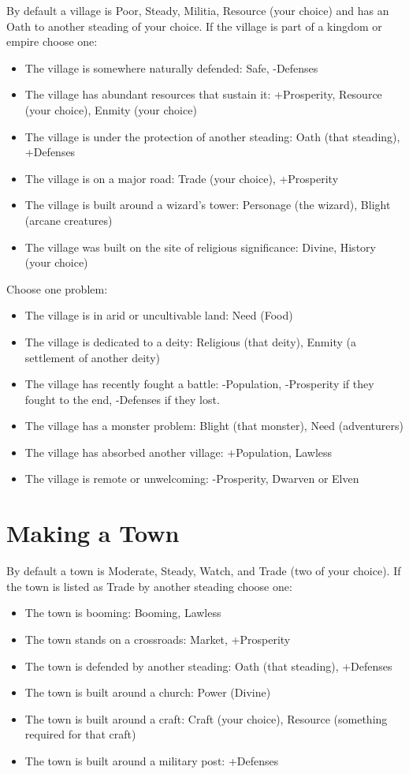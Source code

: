 By default a village is Poor, Steady, Militia, Resource (your choice) and has an Oath to another steading of your choice. If the village is part of a kingdom or empire choose one:
\begin{itemize}
\item The village is somewhere naturally defended: Safe, -Defenses
\item The village has abundant resources that sustain it: +Prosperity, Resource (your choice), Enmity (your choice)
\item The village is under the protection of another steading: Oath (that steading), +Defenses
\item The village is on a major road: Trade (your choice), +Prosperity
\item The village is built around a wizard's tower: Personage (the wizard), Blight (arcane creatures)
\item The village was built on the site of religious significance: Divine, History (your choice)

\end{itemize}


Choose one problem:
\begin{itemize}
\item The village is in arid or uncultivable land: Need (Food)
\item The village is dedicated to a deity: Religious (that deity), Enmity (a settlement of another deity)
\item The village has recently fought a battle: -Population, -Prosperity if they fought to the end, -Defenses if they lost.
\item The village has a monster problem: Blight (that monster), Need (adventurers)
\item The village has absorbed another village: +Population, Lawless
\item The village is remote or unwelcoming: -Prosperity, Dwarven or Elven

\end{itemize}
\section*{Making a Town}


By default a town is Moderate, Steady, Watch, and Trade (two of your choice). If the town is listed as Trade by another steading choose one:
\begin{itemize}
\item The town is booming: Booming, Lawless
\item The town stands on a crossroads: Market, +Prosperity
\item The town is defended by another steading: Oath (that steading), +Defenses
\item The town is built around a church: Power (Divine)
\item The town is built around a craft: Craft (your choice), Resource (something required for that craft)
\item The town is built around a military post: +Defenses

\end{itemize}


